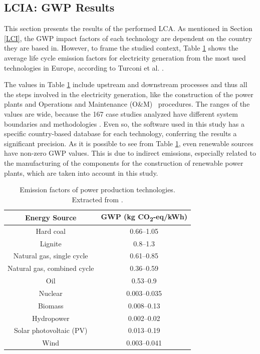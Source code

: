 \subsection{LCIA: GWP Results}
\label{LCIA}

This section presents the results of the performed LCA. As mentioned in Section \ref{LCI}, the GWP impact factors of each technology are dependent on the country they are based in. However, to frame the studied context, Table \ref{EmissionFactors} shows the average life cycle emission factors for electricity generation from the most used technologies in Europe, according to Turconi et al. \cite{Turconi2013LifeLimitations}.

The values in  Table \ref{EmissionFactors} include upstream and downstream processes and thus all the steps involved in the electricity generation, like the construction of the power plants and Operations and Maintenance (O\&M)%
~procedures. The ranges of the values are wide, because the 167 case studies analyzed have different system boundaries and methodologies \cite{Turconi2013LifeLimitations}. Even so, the software used in this study has a specific country-based database for each technology, conferring the results a significant precision. {As it is possible to see from Table \ref{EmissionFactors}, even renewable sources have non-zero GWP values. This is due to indirect emissions, especially related to the manufacturing of the components for the construction of renewable power plants, which are taken into account in this study.}  

 \begin{table}[]
\centering
\caption{Emission factors of power production technologies. Extracted from \cite{Turconi2013LifeLimitations}.}
\label{EmissionFactors}
\begin{tabular}{cc}
\toprule
\textbf{Energy Source} & \textbf{GWP} (kg CO\textsubscript2-eq/kWh{)} \\ \hline
Hard coal              & 0.66--1.05                   \\ 
Lignite                & 0.8--1.3                     \\
Natural gas, single cycle           & 0.61--0.85                    \\ 
Natural gas, combined cycle           & 0.36--0.59                    \\ 
Oil                    & 0.53--0.9                    \\ 
Nuclear                & 0.003--0.035                 \\ 
Biomass                & 0.008--0.13                  \\ 
Hydropower             & 0.002--0.02                  \\ 
Solar photovoltaic (PV)%
                  & 0.013--0.19                  \\ 
Wind                   & 0.003--0.041                 \\ \bottomrule
\end{tabular}
\end{table}



